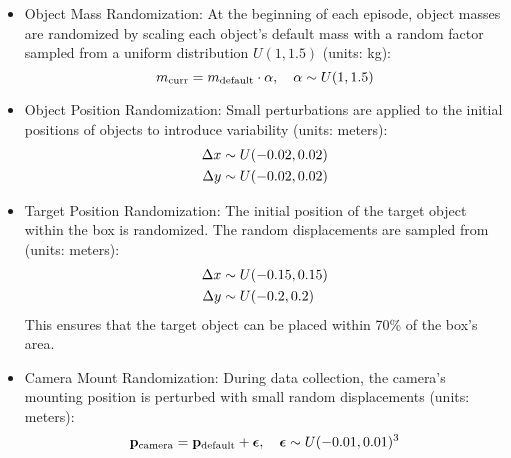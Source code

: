 \begin{itemize}
    \item Object Mass Randomization: At the beginning of each episode, object masses are randomized by scaling each object's default mass with a random factor sampled from a uniform distribution $U(1, 1.5)$ (units: kg):
    \begin{equation}
        m_\textrm{curr} = m_\textrm{default} \cdot \alpha, \quad \alpha \sim U(1, 1.5) \notag
    \end{equation}

    \item Object Position Randomization: Small perturbations are applied to the initial positions of objects to introduce variability (units: meters):
    \begin{equation}
        \begin{aligned}
            \Delta x &\sim U(-0.02, 0.02) \notag\\
            \Delta y &\sim U(-0.02, 0.02) \notag
        \end{aligned}
    \end{equation}

    \item Target Position Randomization: The initial position of the target object within the box is randomized. The random displacements are sampled from (units: meters):
    \begin{equation}
        \begin{aligned}
            \Delta x &\sim U(-0.15, 0.15) \notag\\
            \Delta y &\sim U(-0.2, 0.2) \notag
        \end{aligned}
    \end{equation}
    This ensures that the target object can be placed within 70\% of the box's area.

    \item Camera Mount Randomization: During data collection, the camera's mounting position is perturbed with small random displacements (units: meters):
    \begin{equation}
        \mathbf{p}_\textrm{camera} = \mathbf{p}_\textrm{default} + \boldsymbol{\epsilon}, \quad \boldsymbol{\epsilon} \sim U(-0.01, 0.01)^3 \notag
    \end{equation}
\end{itemize}













